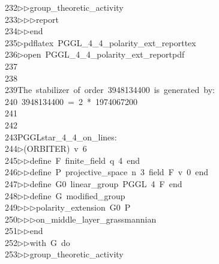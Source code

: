 \begin{tabbing}
232\>$\triangleright$\>$\triangleright$\>group\_theoretic\_activity\ \\[0pt]
233\>$\triangleright$\>$\triangleright$\>$\triangleright$\>report\ \\[0pt]
234\>$\triangleright$\>$\triangleright$\>end\\[0pt]
235\>$\triangleright$\>pdflatex\ PGGL\_4\_4\_polarity\_ext\_reporttex\\[0pt]
236\>$\triangleright$\>open\ PGGL\_4\_4\_polarity\_ext\_reportpdf\\[0pt]
237\>\\[0pt]
238\>\\[0pt]
239\>The\ stabilizer\ of\ order\ 3948134400\ is\ generated\ by:\\[0pt]
240\>\ 3948134400\ =\ 2\ *\ 1974067200\\[0pt]
241\>\\[0pt]
242\>\\[0pt]
243\>PGGLstar\_4\_4\_on\_lines:\\[0pt]
244\>$\triangleright$\>(ORBITER)\ v\ 6\ \\[0pt]
245\>$\triangleright$\>$\triangleright$\>define\ F\ finite\_field\ q\ 4\ end\ \\[0pt]
246\>$\triangleright$\>$\triangleright$\>define\ P\ projective\_space\ n\ 3\ field\ F\ v\ 0\ end\ \\[0pt]
247\>$\triangleright$\>$\triangleright$\>define\ G0\ linear\_group\ PGGL\ 4\ F\ end\ \\[0pt]
248\>$\triangleright$\>$\triangleright$\>define\ G\ modified\_group\ \\[0pt]
249\>$\triangleright$\>$\triangleright$\>$\triangleright$\>polarity\_extension\ G0\ P\ \\[0pt]
250\>$\triangleright$\>$\triangleright$\>$\triangleright$\>on\_middle\_layer\_grassmannian\ \\[0pt]
251\>$\triangleright$\>$\triangleright$\>end\ \\[0pt]
252\>$\triangleright$\>$\triangleright$\>with\ G\ do\ \\[0pt]
253\>$\triangleright$\>$\triangleright$\>group\_theoretic\_activity\ \\[0pt]

\end{tabbing}
